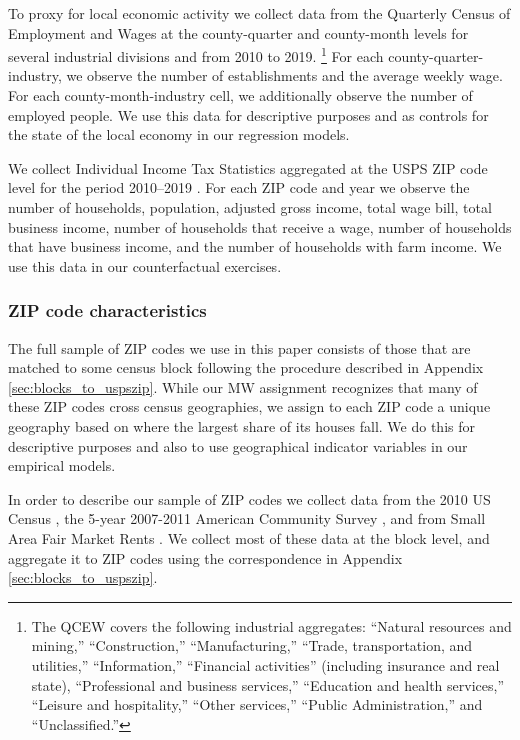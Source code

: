 To proxy for local economic activity we collect data from the 
Quarterly Census of Employment and Wages \parencite[QCEW;][]{QCEW} 
at the county-quarter and county-month levels for several industrial divisions 
and from 2010 to 2019.%
\footnote{The QCEW covers the following industrial aggregates: 
``Natural resources and mining,'' ``Construction,'' ``Manufacturing,'' 
``Trade, transportation, and utilities,'' ``Information,'' 
``Financial activities'' (including insurance and real state), 
``Professional and business services,'' ``Education and health services,'' 
``Leisure and hospitality,'' ``Other services,'' ``Public Administration,''
and ``Unclassified.''}
For each county-quarter-industry, we observe the number of establishments and 
the average weekly wage.
For each county-month-industry cell, we additionally observe the number of 
employed people.
We use this data for descriptive purposes and as controls for the state of 
the local economy in our regression models.

We collect Individual Income Tax Statistics aggregated at the USPS ZIP code 
level for the period 2010--2019 \parencite{IRS}.
For each ZIP code and year we observe the number of households, population, 
adjusted gross income, total wage bill, total business income, number of 
households that receive a wage, number of households that have business income, 
and the number of households with farm income.
We use this data in our counterfactual exercises.

\subsubsection{ZIP code characteristics}
\label{sec:data_other_cross}

The full sample of ZIP codes we use in this paper consists of those that are 
matched to some census block following the procedure described in Appendix \ref{sec:blocks_to_uspszip}.
While our MW assignment recognizes that many of these ZIP codes cross census 
geographies, we assign to each ZIP code a unique geography based on where the 
largest share of its houses fall.
We do this for descriptive purposes and also to use geographical indicator 
variables in our empirical models.

In order to describe our sample of ZIP codes we collect data from the 
2010 US Census \parencite{CensusDecennial}, 
the 5-year 2007-2011 American Community Survey \parencite[ACS;][]{CensusACS}, and 
from Small Area Fair Market Rents \parencite[SAFMR;][]{hudSAFMR}.
We collect most of these data at the block level, and aggregate it to ZIP codes
using the correspondence in Appendix \ref{sec:blocks_to_uspszip}.

